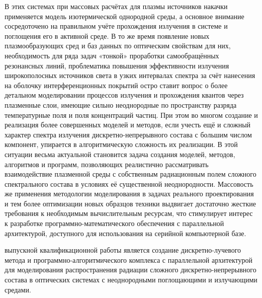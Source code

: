 В этих системах при массовых расчётах для плазмы источников накачки применяется модель изотермической однородной среды, а основное внимание сосредоточено на правильном учёте прохождения излучения в системе и поглощения его в активной среде.
В то же время появление новых плазмообразующих сред и баз данных по оптическим свойствам для них, необходимость для ряда задач «тонкой» проработки самообращённых резонансных линий, проблематика повышения эффективности излучения широкополосных источников света в узких интервалах спектра за счёт нанесения на оболочку интерференционных покрытий остро ставит вопрос о более детальном моделировании процессов излучения и прохождения квантов через плазменные слои, имеющие сильно неоднородные по пространству разряда температурные поля и поля концентраций частиц.
При этом во многом создание и реализация более совершенных моделей и методов, если учесть ещё и сложный характер спектра излучения дискретно-непрерывного состава с большим числом компонент, упирается в алгоритмическую сложность их реализации.
В этой ситуации весьма актуальной становится задача создания моделей, методов, алгоритмов и программ, позволяющих реалистично рассматривать взаимодействие плазменной среды с собственным радиационным полем сложного спектрального состава  в условиях её существенной неоднородности.
Массовость же применения методологии моделирования в задачах реального проектирования и тем более  оптимизации новых образцов техники выдвигает достаточно жесткие требования к необходимым  вычислительным ресурсам, что стимулирует интерес к разработке программно-математического обеспечения с параллельной архитектурой, доступного для использования на серийной компьютерной базе.

 выпускной квалификационной работы является создание дискретно-лучевого метода и программно-алгоритмического комплекса с параллельной архитектурой для моделирования распространения радиации сложного дискретно-непрерывного состава в оптических системах с неоднородными поглощающими и излучающими средами.



